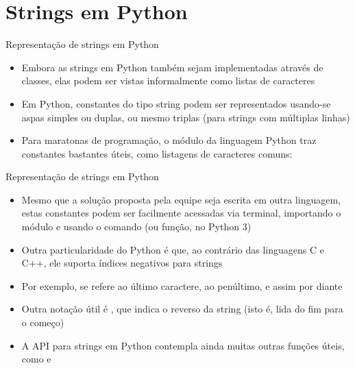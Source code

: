 \section{Strings em Python}

\begin{frame}[fragile]{Representação de strings em Python}

    \begin{itemize}
        \item Embora as strings em Python também sejam implementadas através de classes, elas 
            podem ser vistas informalmente como listas de caracteres
        \pause

        \item Em Python, constantes do tipo string podem ser representados usando-se aspas
            simples ou duplas, ou mesmo triplas (para strings com múltiplas linhas)
        \pause

        \item Para maratonas de programação, o módulo  da linguagem Python traz 
            constantes bastantes úteis, como listagens de caracteres comuns:

    \end{itemize}

\end{frame}

\begin{frame}[fragile]{Representação de strings em Python}

    \begin{itemize}
        \item Mesmo que a solução proposta pela equipe seja escrita em outra linguagem, estas 
            constantes podem ser facilmente acessadas via terminal, importando o módulo e usando o 
            comando (ou função, no Python 3) 
        \pause

        \item Outra particularidade do Python é que, ao contrário das linguagens C e C++, ele 
            suporta índices negativos para strings
        \pause

        \item Por exemplo,  se refere ao último caractere,  ao 
            penúltimo, e assim por diante
        \pause

        \item Outra notação útil é , que indica o reverso da string 
             (isto é,  lida do fim para o começo)
        \pause

        \item A API para strings em Python contempla ainda muitas outras funções úteis, como 
             e 
    \end{itemize}

\end{frame}

